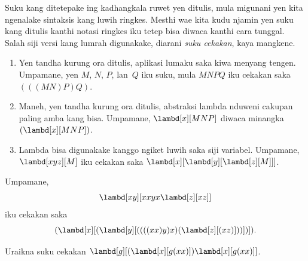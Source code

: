 \documentclass[../../../include/open-logic-section]{subfiles}
\begin{document}

Suku kang ditetepake ing
 kadhangkala
ruwet yen ditulis, mula migunani
yen kita ngenalake sintaksis kang
luwih ringkes. Mesthi wae kita kudu
njamin yen suku kang ditulis kanthi
notasi ringkes iku tetep bisa diwaca
kanthi cara tunggal. Salah siji
versi kang lumrah digunakake,
diarani \emph{suku cekakan},
kaya mangkene.

\begin{enumerate}
\item Yen tandha kurung ora ditulis,
  aplikasi lumaku saka kiwa menyang
  tengen. Umpamane, yen $M$, $N$,
  $P$, lan~$Q$ iku suku, mula
  $MNPQ$ iku cekakan saka
  $(((MN)P)Q)$.
\item Maneh, yen tandha kurung ora
  ditulis, abstraksi lambda nduweni
  cakupan paling amba kang bisa.
  Umpamane, $\lambd[x][MNP]$
  diwaca minangka
  $(\lambd[x][MNP])$.
\item Lambda bisa digunakake kanggo
  ngiket luwih saka siji variabel.
  Umpamane, $\lambd[xyz][M]$
  iku cekakan saka
  $\lambd[x][\lambd[y][\lambd[z][M]]]$.
\end{enumerate}

Umpamane,
\[
\lambd[xy][xxyx \lambd[z][xz]]
\]
iku cekakan saka
\[
(\lambd[x][(\lambd[y][((((xx)y)x)(\lambd[z][(xz)]))])]).
\]

\begin{prob}
Uraikna suku cekakan
$\lambd[g][(\lambd[x][g (x x)])
  \lambd[x][g (x x)]]$.
\end{prob}
\end{document}
